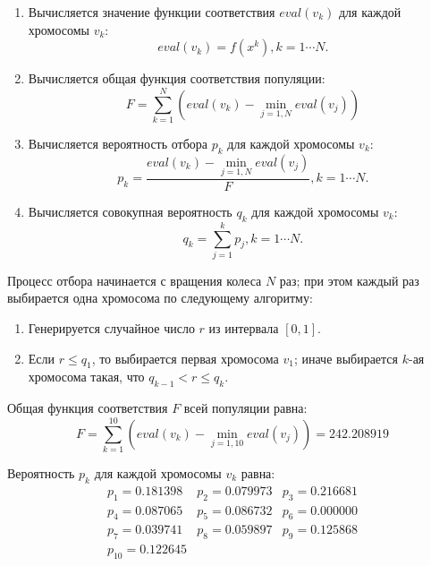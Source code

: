 \begin{enumerate}
  \item{Вычисляется значение функции соответствия $eval(v_k)$ для каждой хромосомы $v_k$:
      \begin{equation}
        eval(v_k) = f(x^k), k = 1 \cdots N.
      \end{equation}
    }
  \item{Вычисляется общая функция соответствия популяции:
      \begin{equation}
        F = \sum_{k=1}^{N}(eval(v_k) - \min\limits_{j=1,N}{eval(v_j)})
      \end{equation}
    }
  \item{Вычисляется вероятность отбора $p_k$ для каждой хромосомы $v_k$:
      \begin{equation}
        p_k = \frac{eval(v_k) - \min\limits_{j=1,N}{eval(v_j)}}{F}, k = 1 \cdots N.
      \end{equation}
    }
  \item{Вычисляется совокупная вероятность $q_k$ для каждой хромосомы $v_k$:
      \begin{equation}
        q_k = \sum_{j=1}^{k}{p_j},  k = 1 \cdots N.
      \end{equation}
    }
\end{enumerate}

Процесс отбора начинается с вращения колеса $N$ раз; при этом каждый раз выбирается
одна хромосома по следующему алгоритму:

\begin{enumerate}
  \item{Генерируется случайное число $r$ из интервала $[0,1]$.}
  \item{Если $r \leq q_1$, то выбирается первая хромосома $v_1$; иначе выбирается $k$-ая хромосома такая, что
    $q_{k-1} < r \leq q_k$}.
\end{enumerate}

Общая функция соответствия $F$ всей популяции равна:
\begin{equation*}
  F = \sum_{k=1}^{10}(eval(v_k) - \min\limits_{j=1,10}{eval(v_j)}) = 242.208919
\end{equation*}

Вероятность $p_k$ для каждой хромосомы $v_k$ равна:
\begin{equation*}
  \begin{array}{lll}
    p_1 = 0.181398 & p_2 = 0.079973 & p_3 = 0.216681 \\
    p_4 = 0.087065 & p_5 = 0.086732 & p_6 = 0.000000 \\
    p_7 = 0.039741 & p_8 = 0.059897 & p_9 = 0.125868 \\
    p_{10} = 0.122645
  \end{array}
\end{equation*}

